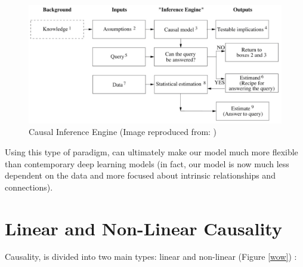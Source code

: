 \begin{figure}[ht!]%
    \centering
    \includegraphics[width=0.8\linewidth]{latex/images/engine.pdf}
    \vspace{-0.2cm}
    \caption{Causal Inference Engine (Image reproduced from: \cite{why})}
    \label{engine}
\end{figure}
\vspace{-0.5cm}

Using this type of paradigm, can ultimately make our model much more flexible than contemporary deep learning models (in fact, our model is now much less dependent on the data and more focused about intrinsic relationships and connections).

\section{Linear and Non-Linear Causality}
\vspace{-0.1cm}
Causality, is divided into two main types: linear and non-linear (Figure \ref{wow})
\cite{system}: 

